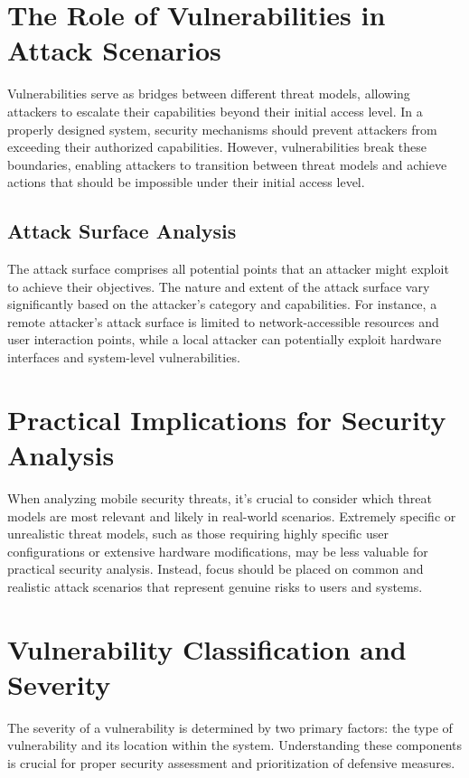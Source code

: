 \documentclass{article}
\begin{document}
\section{The Role of Vulnerabilities in Attack Scenarios}
Vulnerabilities serve as bridges between different threat models, allowing attackers to escalate their capabilities beyond their initial access level. In a properly designed system, security mechanisms should prevent attackers from exceeding their authorized capabilities. However, vulnerabilities break these boundaries, enabling attackers to transition between threat models and achieve actions that should be impossible under their initial access level.

\subsection{Attack Surface Analysis}
The attack surface comprises all potential points that an attacker might exploit to achieve their objectives. The nature and extent of the attack surface vary significantly based on the attacker's category and capabilities. For instance, a remote attacker's attack surface is limited to network-accessible resources and user interaction points, while a local attacker can potentially exploit hardware interfaces and system-level vulnerabilities.

\section{Practical Implications for Security Analysis}
When analyzing mobile security threats, it's crucial to consider which threat models are most relevant and likely in real-world scenarios. Extremely specific or unrealistic threat models, such as those requiring highly specific user configurations or extensive hardware modifications, may be less valuable for practical security analysis. Instead, focus should be placed on common and realistic attack scenarios that represent genuine risks to users and systems.

\section{Vulnerability Classification and Severity}
The severity of a vulnerability is determined by two primary factors: the type of vulnerability and its location within the system. Understanding these components is crucial for proper security assessment and prioritization of defensive measures.
\end{document}
